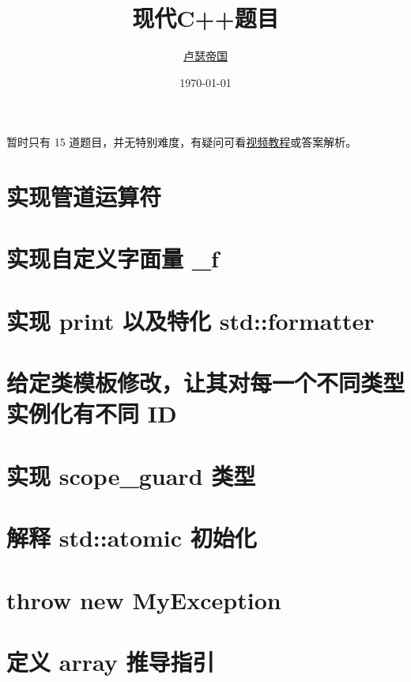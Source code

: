 \documentclass[11pt,fancyhdr]{ctexart}
\title{现代C++题目}
\author{\href{https://github.com/Mq-b/Loser-HomeWork}{卢瑟帝国}\\}
\date{\today}
\begin{document}
\maketitle

\tableofcontents
\newpage

暂时只有 15 道题目，并无特别难度，有疑问可看\href{https://www.bilibili.com/video/BV1Zj411r7eP/}{视频教程}或答案解析。


\section{实现管道运算符}


\section{实现自定义字面量 \_f}

\section{实现 print 以及特化 std::formatter}



\section{给定类模板修改，让其对每一个不同类型实例化有不同 ID}


\section{实现 scope\_guard 类型}


\section{解释 std::atomic 初始化}


\section{throw new MyException}


\section{定义 array 推导指引}

\end{document}
